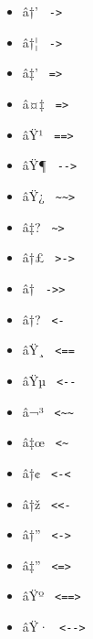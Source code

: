 \begin{itemize}
{  \texttt{\ \textless{}\textless{}\textless{}\ }}
\item
  \label{symbol-arrow.r}{{ â†' }
  \texttt{\ -\textgreater{}\ }}
\item
  \label{symbol-arrow.r.bar}{{ â†¦ }
  \texttt{\ \textbar{}-\textgreater{}\ }}
\item
  \label{symbol-arrow.r.double}{{ â‡' }
  \texttt{\ =\textgreater{}\ }}
\item
  \label{symbol-arrow.r.double.bar}{{ â¤‡ }
  \texttt{\ \textbar{}=\textgreater{}\ }}
\item
  \label{symbol-arrow.r.double.long}{{ âŸ¹ }
  \texttt{\ ==\textgreater{}\ }}
\item
  \label{symbol-arrow.r.long}{{ âŸ¶ }
  \texttt{\ -\/-\textgreater{}\ }}
\item
  \label{symbol-arrow.r.long.squiggly}{{ âŸ¿ }
  \texttt{\ \textasciitilde{}\textasciitilde{}\textgreater{}\ }}
\item
  \label{symbol-arrow.r.squiggly}{{ â‡? }
  \texttt{\ \textasciitilde{}\textgreater{}\ }}
\item
  \label{symbol-arrow.r.tail}{{ â†£ }
  \texttt{\ \textgreater{}-\textgreater{}\ }}
\item
  \label{symbol-arrow.r.twohead}{{ â† }
  \texttt{\ -\textgreater{}\textgreater{}\ }}
\item
  \label{symbol-arrow.l}{{ â†? }
  \texttt{\ \textless{}-\ }}
\item
  \label{symbol-arrow.l.double.long}{{ âŸ¸ }
  \texttt{\ \textless{}==\ }}
\item
  \label{symbol-arrow.l.long}{{ âŸµ }
  \texttt{\ \textless{}-\/-\ }}
\item
  \label{symbol-arrow.l.long.squiggly}{{ â¬³ }
  \texttt{\ \textless{}\textasciitilde{}\textasciitilde{}\ }}
\item
  \label{symbol-arrow.l.squiggly}{{ â‡œ }
  \texttt{\ \textless{}\textasciitilde{}\ }}
\item
  \label{symbol-arrow.l.tail}{{ â†¢ }
  \texttt{\ \textless{}-\textless{}\ }}
\item
  \label{symbol-arrow.l.twohead}{{ â†ž }
  \texttt{\ \textless{}\textless{}-\ }}
\item
  \label{symbol-arrow.l.r}{{ â†'' }
  \texttt{\ \textless{}-\textgreater{}\ }}
\item
  \label{symbol-arrow.l.r.double}{{ â‡'' }
  \texttt{\ \textless{}=\textgreater{}\ }}
\item
  \label{symbol-arrow.l.r.double.long}{{ âŸº }
  \texttt{\ \textless{}==\textgreater{}\ }}
\item
  \label{symbol-arrow.l.r.long}{{ âŸ· }
  \texttt{\ \textless{}-\/-\textgreater{}\ }}
\end{itemize}


